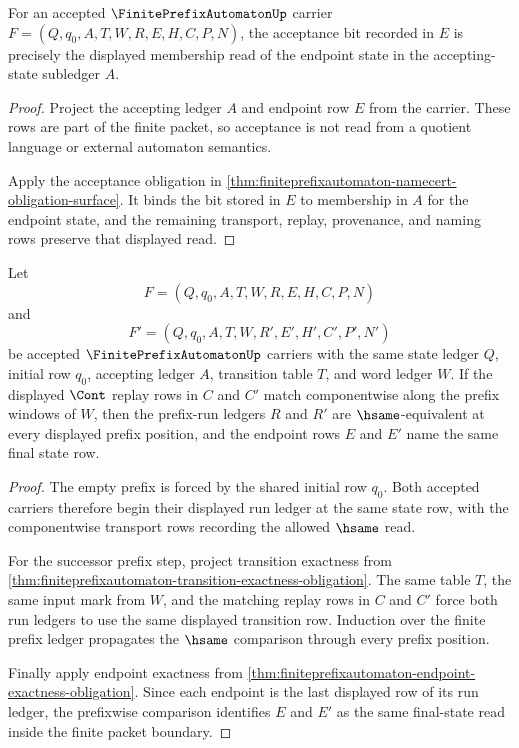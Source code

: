 \begin{theorem}
\label{thm:finiteprefixautomaton-acceptance-exactness-obligation}
For an accepted $\FinitePrefixAutomatonUp$ carrier $F=(Q,q_0,A,T,W,R,E,H,C,P,N)$, the acceptance bit recorded in $E$ is precisely the displayed membership read of the endpoint state in the accepting-state subledger $A$.
\end{theorem}
\begin{proof}
Project the accepting ledger $A$ and endpoint row $E$ from the carrier. These rows are part of the finite packet, so acceptance is not read from a quotient language or external automaton semantics.

Apply the acceptance obligation in \autoref{thm:finiteprefixautomaton-namecert-obligation-surface}. It binds the bit stored in $E$ to membership in $A$ for the endpoint state, and the remaining transport, replay, provenance, and naming rows preserve that displayed read.
\end{proof}

\begin{theorem}
\label{thm:finiteprefixautomaton-run-prefix-determinism}
Let
$$
F=(Q,q_0,A,T,W,R,E,H,C,P,N)
$$
and
$$
F'=(Q,q_0,A,T,W,R',E',H',C',P',N')
$$
be accepted $\FinitePrefixAutomatonUp$ carriers with the same state ledger $Q$, initial row $q_0$, accepting ledger $A$, transition table $T$, and word ledger $W$. If the displayed $\Cont$ replay rows in $C$ and $C'$ match componentwise along the prefix windows of $W$, then the prefix-run ledgers $R$ and $R'$ are $\hsame$-equivalent at every displayed prefix position, and the endpoint rows $E$ and $E'$ name the same final state row.
\end{theorem}
\begin{proof}
The empty prefix is forced by the shared initial row $q_0$. Both accepted carriers therefore begin their displayed run ledger at the same state row, with the componentwise transport rows recording the allowed $\hsame$ read.

For the successor prefix step, project transition exactness from \autoref{thm:finiteprefixautomaton-transition-exactness-obligation}. The same table $T$, the same input mark from $W$, and the matching replay rows in $C$ and $C'$ force both run ledgers to use the same displayed transition row. Induction over the finite prefix ledger propagates the $\hsame$ comparison through every prefix position.

Finally apply endpoint exactness from \autoref{thm:finiteprefixautomaton-endpoint-exactness-obligation}. Since each endpoint is the last displayed row of its run ledger, the prefixwise comparison identifies $E$ and $E'$ as the same final-state read inside the finite packet boundary.
\end{proof}


